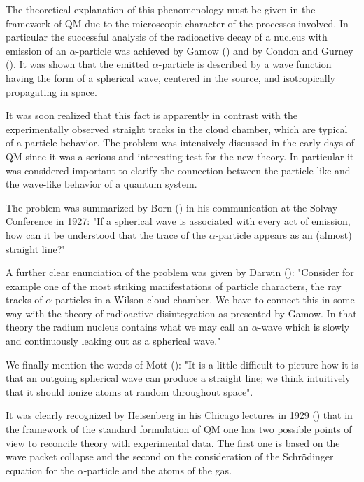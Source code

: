 \documentclass[12pt,reqno]{amsart}
\newcommand{\n}{\relax}
\numberwithin{equation}{section}
\begin{document}
\n
The theoretical explanation of this phenomenology must be given in the framework of QM due to the microscopic character of the processes involved. In particular the successful analysis of the radioactive decay of a nucleus  with emission of an $\alpha$-particle was achieved  by Gamow (\cite{ga}) and by Condon and Gurney (\cite{cg}). It was shown that the emitted $\alpha$-particle is described by a wave function having the form of a spherical wave, centered in the source,  and isotropically propagating in space. 


\n
It was soon realized that this fact is apparently in contrast with the experimentally observed straight tracks in the cloud chamber, which are typical of a particle behavior.  The problem was intensively discussed in the early days of QM since it was a serious and interesting test for the new theory.  In particular it was considered important  to clarify the connection between the particle-like and the wave-like behavior of a quantum system.

\n
The problem was summarized by  Born (\cite{ep}) in his communication at the Solvay Conference in 1927: "If a spherical wave is associated with every act of emission, how can  it be understood that the trace of the $\alpha$-particle appears as an (almost) straight line?"

\n
 A further clear enunciation of the problem was given by Darwin (\cite{d}): "Consider for example one of the most striking manifestations of particle characters, the ray tracks of $\alpha$-particles in a Wilson cloud chamber. We have to connect this in some way with the theory of radioactive disintegration as presented by Gamow. In that theory the radium nucleus contains what we  may call an $\alpha$-wave which is slowly and continuously leaking out as a spherical wave."

\n
We finally mention the words of  Mott (\cite{m}): "It is a little difficult to picture how it is that an outgoing spherical wave can produce a straight line; we think intuitively that it should ionize atoms at random throughout space".

\n
It was clearly recognized by Heisenberg in his Chicago lectures in 1929 (\cite{h})  that in the framework of the standard formulation of QM one has two possible points of view to reconcile  theory with experimental data.  The first one is based on the wave packet collapse and the second on the consideration of the Schr\"{o}dinger equation for the  $\alpha$-particle and 
the atoms of the gas. 
\end{document}

